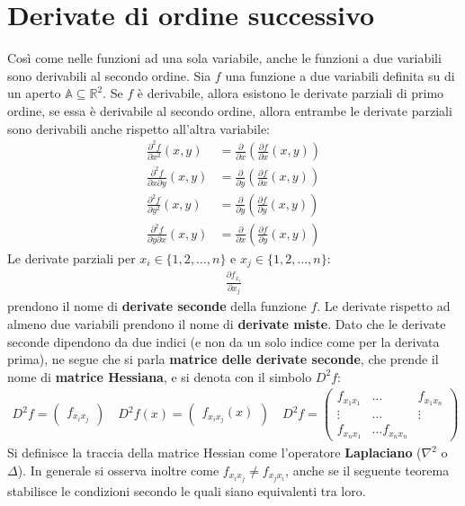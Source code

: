 \documentclass[a4paper, oneside]{book}
\begin{document}
\section{Derivate di ordine successivo}
Così come nelle funzioni ad una sola variabile, anche le funzioni a due 
variabili sono derivabili al secondo ordine. Sia $f$ una funzione a due variabili
definita su di un aperto $\mathbb{A} \subseteq \mathbb{R}^{2}$. Se $f$ è derivabile, allora
esistono le derivate parziali di primo ordine, se essa è derivabile al secondo ordine, allora 
entrambe le derivate parziali sono derivabili anche rispetto all'altra variabile:
\begin{align}
    \frac{\partial^{2} f }{\partial x^{2} }(x, y) &= \frac{\partial}{\partial x}\left(\frac{\partial f}{\partial x} (x, y) \right)  \\
    \frac{\partial^{2} f}{\partial x \partial y}(x, y) &= \frac{\partial }{\partial y} \left(\frac{\partial f}{\partial x}(x,y) \right)  \\
    \frac{\partial^{2} f }{\partial y^{2} }(x, y) &= \frac{\partial }{\partial y}\left(\frac{\partial f}{\partial y} (x, y) \right)  \\
    \frac{\partial^{2} f}{\partial y \partial x}(x, y) &= \frac{\partial }{\partial x} \left(\frac{\partial f}{\partial y}(x,y) \right)  
\end{align}
Le derivate parziali per $x_i \in \{1, 2, \dots, n\}$ e $x_j \in \{1, 2, \dots, n\}$:
\begin{align}
    \frac{\partial f_{x_i}}{\partial x_j}  
\end{align}
prendono il nome di \textbf{derivate seconde} della funzione $f$. Le derivate 
rispetto ad almeno due variabili prendono il nome di \textbf{derivate miste}.
Dato che le derivate seconde dipendono da due indici  (e non da un solo indice come 
per la derivata prima), ne segue che si parla \textbf{matrice delle derivate seconde}, 
che prende il nome di \textbf{matrice Hessiana}, e si denota con il 
simbolo $D^{2}f$:
\begin{align}
    D^{2} f = \begin{pmatrix}
        f_{x_i x_j}
    \end{pmatrix}
    \quad D^{2} f(x) = \begin{pmatrix}
        f_{x_i x_j}(x)
    \end{pmatrix}
    \quad
    D^{2}f = \begin{pmatrix}
        f_{x_1 x_1} & \dots & f_{x_1 x_n} \\
        \vdots &\dots & \vdots \\
        f_{x_n x_1} & \dots f_{x_n x_n}
    \end{pmatrix}
\end{align}
Si definisce la traccia della matrice Hessian come l'operatore \textbf{Laplaciano} ($\nabla^{2}$ o $\Delta$). In generale 
si osserva inoltre come $f_{x_i x_j} \neq f_{x_j x_i}$, anche se il seguente teorema 
stabilisce le condizioni secondo le quali siano equivalenti tra loro. 
\end{document}
